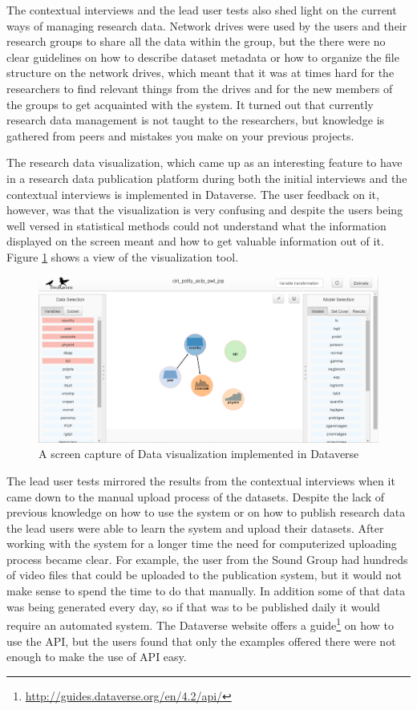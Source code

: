 The contextual interviews and the lead user tests also shed light on the
current ways of managing research data. Network drives were used by the
users and their research groups to share all the data within the group, but
the there were no clear guidelines on how to describe dataset metadata or how
to organize the file structure on the network drives, which meant that it was
at times hard for the researchers to find relevant things from the drives and
for the new members of the groups to get acquainted with the system. It turned
out that currently research data management is not taught to the researchers,
but knowledge is gathered from peers and mistakes you make on your previous
projects.

The research data visualization, which came up as an interesting feature to
have in a research data publication platform during both the initial interviews
and the contextual interviews is implemented in Dataverse. The user feedback
on it, however, was that the visualization is very confusing and despite the
users being well versed in statistical methods could not understand what the
information displayed on the screen meant and how to get valuable information
out of it. Figure \ref{fig:tworavens} shows a view of the visualization tool.

\begin{figure}
    \begin{centering}
        \includegraphics[width=\textwidth]{images/tworavens}
    \end{centering}
    \caption{A screen capture of Data visualization implemented in Dataverse}
    \label{fig:tworavens}
\end{figure}

The lead user tests mirrored the results from the contextual interviews when
it came down to the manual upload process of the datasets. Despite the lack of
previous knowledge on how to use the system or on how to publish research data
the lead users were able to learn the system and upload their datasets. After
working with the system for a longer time the need for computerized uploading
process became clear. For example, the user from the Sound Group had hundreds
of video files that could be uploaded to the publication system, but it would
not make sense to spend the time to do that manually. In addition some of that
data was being generated every day, so if that was to be published daily it
would require an automated system. The Dataverse website offers a
guide\footnote{\url{http://guides.dataverse.org/en/4.2/api/}} on how
to use the API, but the users found that only the examples offered there were
not enough to make the use of API easy.

